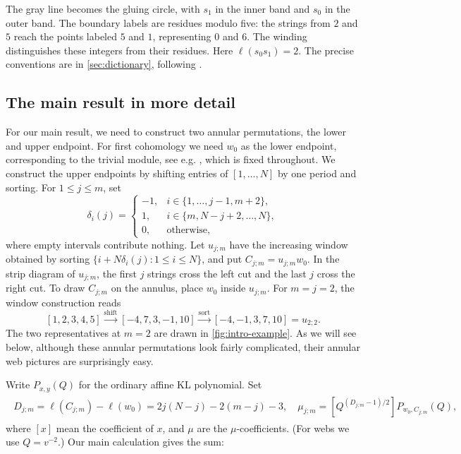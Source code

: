 \documentclass[a4paper,11pt]{amsart}
\numberwithin{equation}{subsection}
\theoremstyle{plain}
\theoremstyle{definition}
\theoremstyle{remark}
\begin{document}
The gray line becomes the gluing circle, with $s_1$ in the inner
band and $s_0$ in the outer band. The boundary labels are residues
modulo five: the strings from $2$ and $5$ reach the points labeled
$5$ and $1$, representing $0$ and $6$.
The winding distinguishes these integers from their residues.
Here $\ell(s_0s_1)=2$.
The precise conventions are in \autoref{sec:dictionary}, following
\cite[Section~2A]{HT}.

\subsection{The main result in more detail}

For our main result, we need to construct two annular permutations, the lower and upper endpoint.
For first cohomology we need $w_0$ as the lower endpoint,
corresponding to the trivial module, see e.g. \cite[Section~4]{SX}, which is fixed throughout.
We construct the upper endpoints by shifting entries of
$[1,\ldots,N]$ by one period and sorting. For $1\le j\le m$, set
\[
\delta_i(j)=\begin{cases}
-1,&i\in\{1,\ldots,j-1,m+2\},\\
1,&i\in\{m,N-j+2,\ldots,N\},\\
0,&\text{otherwise},
\end{cases}
\]
where empty intervals contribute nothing. Let $u_{j;m}$ have the
increasing window obtained by sorting
$\{i+N\delta_i(j):1\le i\le N\}$, and put $C_{j;m}=u_{j;m}w_0$.
In the strip diagram of $u_{j;m}$, the first $j$ strings cross the
left cut and the last $j$ cross the right cut.
To draw $C_{j;m}$ on the annulus, place $w_0$ inside $u_{j;m}$.
For $m=j=2$, the window construction reads
\[
[1,2,3,4,5]
\xrightarrow{\text{shift}}[-4,7,3,-1,10]
\xrightarrow{\text{sort}}[-4,-1,3,7,10]=u_{2;2}.
\]
The two representatives at $m=2$ are drawn in
\autoref{fig:intro-example}. As we will see below, 
although these annular permutations look fairly complicated, their annular web pictures are surprisingly easy.

Write $P_{x,y}(Q)$ for the ordinary affine KL polynomial. Set
\begin{gather}\label{eq:family-coefficient}
\begin{aligned}
D_{j;m}=\ell(C_{j;m})-\ell(w_0)
=2j(N-j)-2(m-j)-3,\quad
\mu_{j;m}=[Q^{(D_{j;m}-1)/2}]P_{w_0,C_{j;m}}(Q),
\end{aligned}
\end{gather}
where $[x]$ mean the coefficient of $x$, and $\mu$ are the $\mu$-coefficients.
(For webs we use $Q=v^{-2}$.) Our main calculation gives the sum:
\end{document}
